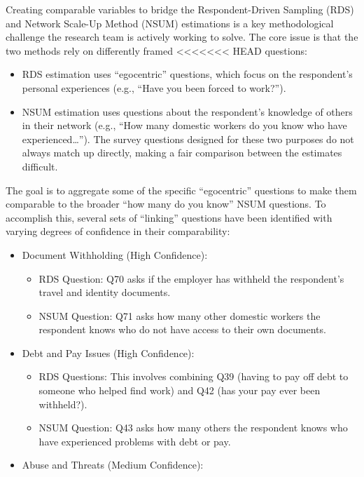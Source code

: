 \documentclass[
  12pt,
  letterpaper,
  DIV=11,
  numbers=noendperiod]{scrartcl}
\providecommand{\tightlist}{%
  \setlength{\itemsep}{0pt}\setlength{\parskip}{0pt}}
\theoremstyle{plain}
\theoremstyle{definition}
\begin{document}
{Creating comparable variables to bridge the Respondent-Driven Sampling
(RDS) and Network Scale-Up Method (NSUM) estimations is a key
methodological challenge the research team is actively working to solve.
The core issue is that the two methods rely on differently framed
<<<<<<< HEAD
questions:

\begin{itemize}
\tightlist
\item
  RDS estimation uses ``egocentric'' questions, which focus on the
  respondent's personal experiences (e.g., ``Have you been forced to
  work?'').
\item
  NSUM estimation uses questions about the respondent's knowledge of
  others in their network (e.g., ``How many domestic workers do you know
  who have experienced\ldots{}''). The survey questions designed for
  these two purposes do not always match up directly, making a fair
  comparison between the estimates difficult.
\end{itemize}

The goal is to aggregate some of the specific ``egocentric'' questions
to make them comparable to the broader ``how many do you know'' NSUM
questions. To accomplish this, several sets of ``linking'' questions
have been identified with varying degrees of confidence in their
comparability:

\begin{itemize}
\tightlist
\item
  Document Withholding (High Confidence):

  \begin{itemize}
  \tightlist
  \item
    RDS Question: Q70 asks if the employer has withheld the respondent's
    travel and identity documents.
  \item
    NSUM Question: Q71 asks how many other domestic workers the
    respondent knows who do not have access to their own documents.
  \end{itemize}
\item
  Debt and Pay Issues (High Confidence):

  \begin{itemize}
  \tightlist
  \item
    RDS Questions: This involves combining Q39 (having to pay off debt
    to someone who helped find work) and Q42 (has your pay ever been
    withheld?).
  \item
    NSUM Question: Q43 asks how many others the respondent knows who
    have experienced problems with debt or pay.
  \end{itemize}
\item
  Abuse and Threats (Medium Confidence):


\end{itemize}}
\end{document}
